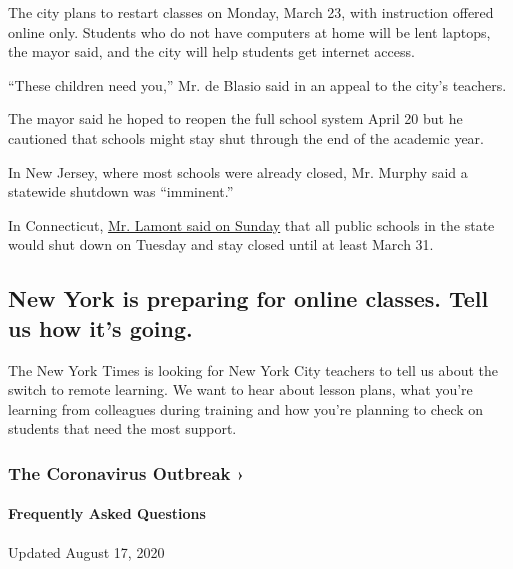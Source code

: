 The city plans to restart classes on Monday, March 23, with instruction
offered online only. Students who do not have computers at home will be
lent laptops, the mayor said, and the city will help students get
internet access.

``These children need you,'' Mr. de Blasio said in an appeal to the
city's teachers.

The mayor said he hoped to reopen the full school system April 20 but he
cautioned that schools might stay shut through the end of the academic
year.

In New Jersey, where most schools were already closed, Mr. Murphy said a
statewide shutdown was ``imminent.''

In Connecticut,
\href{https://twitter.com/govnedlamont/status/1239315132435619843?s=21}{Mr.
Lamont said on Sunday} that all public schools in the state would shut
down on Tuesday and stay closed until at least March 31.

\hypertarget{new-york-is-preparing-for-online-classes-tell-us-how-its-going}{%
\subsection{New York is preparing for online classes. Tell us how it's
going.}\label{new-york-is-preparing-for-online-classes-tell-us-how-its-going}}

The New York Times is looking for New York City teachers to tell us
about the switch to remote learning. We want to hear about lesson plans,
what you're learning from colleagues during training and how you're
planning to check on students that need the most support.

\href{https://www.nytimes.com/news-event/coronavirus?action=click\&pgtype=Article\&state=default\&region=MAIN_CONTENT_3\&context=storylines_faq}{}

\hypertarget{the-coronavirus-outbreak-}{%
\subsubsection{The Coronavirus Outbreak
›}\label{the-coronavirus-outbreak-}}

\hypertarget{frequently-asked-questions}{%
\paragraph{Frequently Asked
Questions}\label{frequently-asked-questions}}

Updated August 17, 2020

